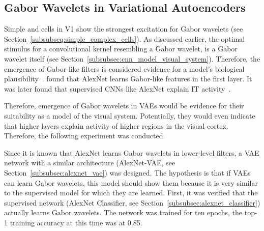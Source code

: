 \subsection{Gabor Wavelets in Variational Autoencoders}\label{subsec:results_visual_features_in_variational_autoencoders}
Simple and cells in \ac{V1} show the strongest excitation for Gabor wavelets (see Section~\ref{subsubseq:simple_complex_cells}).
As discussed earlier, the optimal stimulus for a convolutional kernel resembling a Gabor wavelet, is a Gabor wavelet itself (see Section~\ref{subsubsec:cnn_model_visual_system}).
Therefore, the emergence of Gabor-like filters is considered evidence for a model's biological plausibility~\citep{berkes2005slow}.
\citet{krizhevsky2012imagenet} found that AlexNet learns Gabor-like features in the first layer.
It was later found that supervised \acp{CNN} like AlexNet explain \ac{IT} activity~\citep{khaligh2014deep}.

Therefore, emergence of Gabor wavelets in \acp{VAE} would be evidence for their suitability as a model of the visual system.
Potentially, they would even indicate that higher layers explain activity of higher regions in the visual cortex.
Therefore, the following experiment was conducted.

Since it is known that AlexNet learns Gabor wavelets in lower-level filters, a \ac{VAE} network with a similar architecture (AlexNet-\ac{VAE}, see Section~\ref{subsubsec:alexnet_vae}) was designed.
The hypothesis is that if \acp{VAE} can learn Gabor wavelets, this model should show them because it is very similar to the supervised model for which they are learned.
First, it was verified that the supervised network (AlexNet Classifier, see Section~\ref{subsubsec:alexnet_classifier}) actually learns Gabor wavelets.
The network was trained for ten epochs, the top-1 training accuracy at this time was at 0.85.


